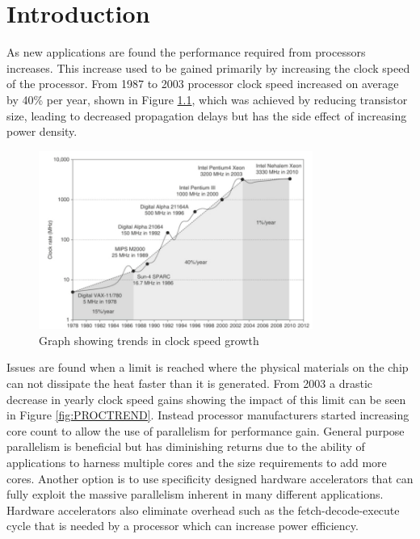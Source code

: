\chapter{Introduction}
\label{ch:introduction}
As new applications are found the performance required from processors increases. This increase used to be gained primarily by increasing the clock speed of the processor. From 1987 to 2003 processor clock speed increased on average by 40\% per year, shown in Figure \ref{fig:CPUSPEED}, which was achieved by reducing transistor size, leading to decreased propagation delays but has the side effect of increasing power density.

\begin{figure}[h]
	\centering
	\includegraphics[width=0.8\textwidth]{CPU_clock_speed.png}
	\caption{Graph showing trends in clock speed growth \cite[Figure~1.11] {CPUSPEED}}
	\label{fig:CPUSPEED}
\end{figure}

Issues are found when a limit is reached where the physical materials on the chip can not dissipate the heat faster than it is generated. From 2003 a drastic decrease in yearly clock speed gains showing the impact of this limit can be seen in Figure \ref{fig:PROCTREND}. Instead processor manufacturers started increasing core count to allow the use of parallelism for performance gain. General purpose parallelism is beneficial but has diminishing returns due to the ability of applications to harness multiple cores and the size requirements to add more cores. Another option is to use specificity designed hardware accelerators that can fully exploit the massive parallelism inherent in many different applications. Hardware accelerators also eliminate overhead such as the fetch\mbox{-}decode\mbox{-}execute cycle that is needed by a processor which can increase power efficiency.

